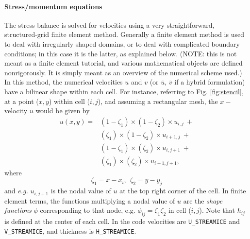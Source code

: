 \paragraph{Stress/momentum equations}

The stress balance is solved for velocities using a very straightforward,
structured-grid finite element method. Generally a finite element method is used
to deal with irregularly shaped domains, or to deal with complicated
boundary conditions; in this case it is the latter, as explained below. (NOTE:
this is not meant as a finite element tutorial, and various mathematical objects
are defined nonrigorously. It is simply meant as an overview of the numerical
scheme used.)
In this method, the numerical velocities
$u$ and $v$ (or $\overline{u}$, $\overline{v}$ if a hybrid formulation) have a
bilinear shape within each cell. For instance, referring to Fig.
\ref{fig:stencil}, at a point ($x,y$) within cell ($i,j$), and assuming a
rectangular mesh, the $x-$velocity $u$ would be given by 
\begin{align}
 u(x,y) = & (1-\zeta_1)\times(1-\zeta_2)\times u_{i,j}\ + \\
 & (\zeta_1)\times(1-\zeta_2)\times u_{i+1,j}\ + \\
 & (1-\zeta_1)\times(\zeta_2)\times u_{i,j+1}\ + \\
 & (\zeta_1)\times(\zeta_2)\times u_{i+1,j+1},
\end{align}
where
\begin{equation}
 \zeta_1 = x-x_i, \ \  \zeta_2 = y-y_j
\end{equation}
and \textit{e.g.} $u_{i,j+1}$ is the nodal value of $u$ at the top right corner
of the cell. In finite element terms, the functions multiplying a nodal value of
$u$ are the \textit{shape
functions} $\phi$ corresponding to that node, e.g. $\phi_{ij}=\zeta_1\zeta_2$ in cell
($i,j$). Note that $h_{ij}$ is defined at the center of each cell. In the code
velocities are \texttt{U\_STREAMICE} and \texttt{V\_STREAMICE}, and thickness 
is \texttt{H\_STREAMICE}.

